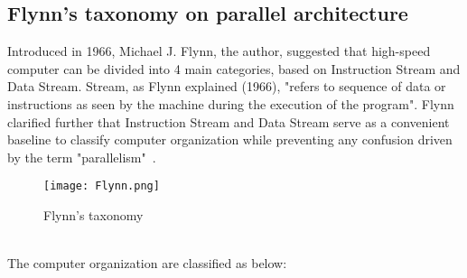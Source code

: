 \subsection{Flynn's taxonomy on parallel architecture}

Introduced in 1966, Michael J. Flynn, the author, suggested that high-speed computer can be divided into 4 main categories, based on Instruction Stream and Data Stream. Stream, as Flynn explained (1966), "refers to sequence of data or instructions as seen by the machine during the execution of the program". Flynn clarified further that Instruction Stream and Data Stream serve as a convenient baseline to classify computer organization while preventing any confusion driven by the term "parallelism"~\cite{flynn}. \\
\begin{figure}[H]
\texttt{[image: Flynn.png]}
\centering
\caption{Flynn's taxonomy}
\end{figure}
~\\
The computer organization are classified as below:
